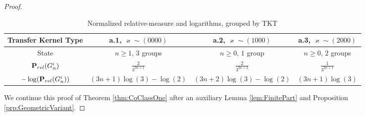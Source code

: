 \documentclass[10pt,a4paper]{amsart}
\begin{document}
\begin{proof}
\renewcommand{\arraystretch}{1.2}
\begin{table}[ht]
\caption{Normalized relative-measure and logarithms, grouped by TKT}
\label{tbl:RelativeMeasuresOne}
\begin{center}
\begin{tabular}{|c||c|c|c|}
\hline
 Transfer Kernel Type            & a.1, \(\varkappa\sim (0000)\)    &  a.2, \(\varkappa\sim (1000)\)   &  a.3, \(\varkappa\sim (2000)\)   \\
\hline
 State                           & \(n\ge 1\), \(3\) groups         & \(n\ge 0\), \(1\) group          & \(n\ge 0\), \(2\) groups         \\
 \({\bf P}_{rel}(G_n^i)\)        & \(\frac{2}{3^{3n+1}}\)           & \(\frac{2}{3^{3n+2}}\)           & \(\frac{1}{3^{3n+1}}\)           \\
 \(-\log({\bf P}_{rel}(G_n^i))\) & \((3n+1)\log(3)-\log(2)\)        & \((3n+2)\log(3)-\log(2)\)        & \((3n+1)\log(3)\)                \\
\hline
\end{tabular}
\end{center}
\end{table}

\noindent
We continue this proof of Theorem
\ref{thm:CoClassOne}
after an auxiliary Lemma
\ref{lem:FinitePart}
and Proposition
\ref{prp:GeometricVariant}.
\end{proof}
\end{document}
